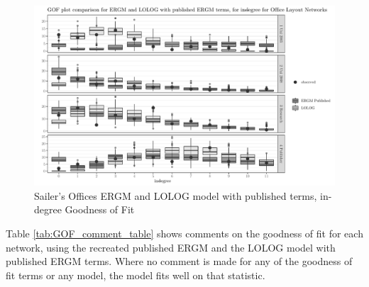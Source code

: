 \documentclass[
]{statsoc}
\begin{document}
\begin{figure}

{\centering \includegraphics{lolog_catelog_writeup_JRSSA_major_revisions_git_files/figure-latex/unnamed-chunk-6-1} 

}

\caption{\label{fig:sailer_gof_pub_ideg}Sailer's Offices ERGM and LOLOG model with published terms, in-degree Goodness of Fit}\label{fig:unnamed-chunk-6}
\end{figure}

Table \ref{tab:GOF_comment_table} shows comments on the goodness of fit
for each network, using the recreated published ERGM and the LOLOG model
with published ERGM terms. Where no comment is made for any of the
goodness of fit terms or any model, the model fits well on that
statistic.
\end{document}
